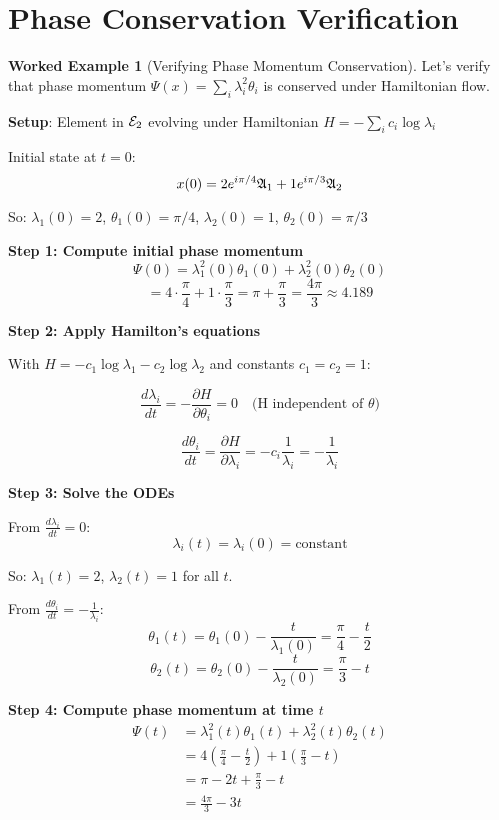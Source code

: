 \documentclass[12pt,a4paper]{article}
\theoremstyle{definition}
\newtheorem{example}{Worked Example}[section]
\theoremstyle{remark}
\begin{document}
\newpage
\section{Phase Conservation Verification}

\begin{example}[Verifying Phase Momentum Conservation]
Let's verify that phase momentum $\Psi(x) = \sum_i \lambda_i^2 \theta_i$ is conserved under Hamiltonian flow.

\textbf{Setup}: Element in $\mathcal{E}_{2}$ evolving under Hamiltonian $H = -\sum_i c_i \log \lambda_i$

Initial state at $t=0$:
$$x(0) = 2e^{i\pi/4} \mathfrak{A}_{1} + 1e^{i\pi/3} \mathfrak{A}_{2}$$

So: $\lambda_1(0) = 2$, $\theta_1(0) = \pi/4$, $\lambda_2(0) = 1$, $\theta_2(0) = \pi/3$

\textbf{Step 1: Compute initial phase momentum}
$$\Psi(0) = \lambda_1^2(0) \theta_1(0) + \lambda_2^2(0) \theta_2(0)$$
$$= 4 \cdot \frac{\pi}{4} + 1 \cdot \frac{\pi}{3} = \pi + \frac{\pi}{3} = \frac{4\pi}{3} \approx 4.189$$

\textbf{Step 2: Apply Hamilton's equations}

With $H = -c_1 \log \lambda_1 - c_2 \log \lambda_2$ and constants $c_1 = c_2 = 1$:

$$\frac{d\lambda_i}{dt} = -\frac{\partial H}{\partial \theta_i} = 0 \quad \text{(H independent of $\theta$)}$$

$$\frac{d\theta_i}{dt} = \frac{\partial H}{\partial \lambda_i} = -c_i \frac{1}{\lambda_i} = -\frac{1}{\lambda_i}$$

\textbf{Step 3: Solve the ODEs}

From $\frac{d\lambda_i}{dt} = 0$: 
$$\lambda_i(t) = \lambda_i(0) = \text{constant}$$

So: $\lambda_1(t) = 2$, $\lambda_2(t) = 1$ for all $t$.

From $\frac{d\theta_i}{dt} = -\frac{1}{\lambda_i}$:
$$\theta_1(t) = \theta_1(0) - \frac{t}{\lambda_1(0)} = \frac{\pi}{4} - \frac{t}{2}$$
$$\theta_2(t) = \theta_2(0) - \frac{t}{\lambda_2(0)} = \frac{\pi}{3} - t$$

\textbf{Step 4: Compute phase momentum at time $t$}
\begin{align}
\Psi(t) &= \lambda_1^2(t) \theta_1(t) + \lambda_2^2(t) \theta_2(t) \\
&= 4 \left(\frac{\pi}{4} - \frac{t}{2}\right) + 1 \left(\frac{\pi}{3} - t\right) \\
&= \pi - 2t + \frac{\pi}{3} - t \\
&= \frac{4\pi}{3} - 3t
\end{align}


\end{example}
\end{document}
